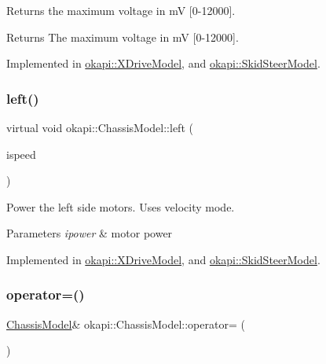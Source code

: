 Returns the maximum voltage in mV \mbox{[}0-\/12000\mbox{]}.

\begin{DoxyReturn}{Returns}
The maximum voltage in mV \mbox{[}0-\/12000\mbox{]}. 
\end{DoxyReturn}


Implemented in \mbox{\hyperlink{classokapi_1_1XDriveModel_a402487e35a717c47cfcc85ad1cfb0861}{okapi\+::\+X\+Drive\+Model}}, and \mbox{\hyperlink{classokapi_1_1SkidSteerModel_ad4849d18c3a244eb60e1056860a3c4cf}{okapi\+::\+Skid\+Steer\+Model}}.

\mbox{\label{classokapi_1_1ChassisModel_aa2008856c169eb64c6648bc64c31c504}} 
\subsubsection{\texorpdfstring{left()}{left()}}
{\footnotesize\ttfamily virtual void okapi\+::\+Chassis\+Model\+::left (\begin{DoxyParamCaption}\item[{double}]{ispeed }\end{DoxyParamCaption})\hspace{0.3cm}{\ttfamily [pure virtual]}}

Power the left side motors. Uses velocity mode.


\begin{DoxyParams}{Parameters}
{\em ipower} & motor power \\
\hline
\end{DoxyParams}


Implemented in \mbox{\hyperlink{classokapi_1_1XDriveModel_a0a4688df022b66164e81709e6eaa02e5}{okapi\+::\+X\+Drive\+Model}}, and \mbox{\hyperlink{classokapi_1_1SkidSteerModel_af2b00108853b82eb0fb5ecb3b71f413d}{okapi\+::\+Skid\+Steer\+Model}}.

\mbox{\label{classokapi_1_1ChassisModel_ab6c89183b8a5317a1e149df5ed22dfb1}} 
\subsubsection{\texorpdfstring{operator=()}{operator=()}}
{\footnotesize\ttfamily \mbox{\hyperlink{classokapi_1_1ChassisModel}{Chassis\+Model}}\& okapi\+::\+Chassis\+Model\+::operator= (\begin{DoxyParamCaption}\item[{const \mbox{\hyperlink{classokapi_1_1ChassisModel}{Chassis\+Model}} \&}]{ }\end{DoxyParamCaption})\hspace{0.3cm}{\ttfamily [delete]}}

